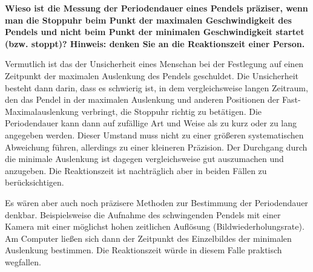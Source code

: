 \documentclass[
]{article}
\begin{document}
\textbf{Wieso ist die Messung der Periodendauer eines Pendels präziser,
wenn man die Stoppuhr beim Punkt der maximalen Geschwindigkeit des
Pendels und nicht beim Punkt der minimalen Geschwindigkeit startet (bzw.
stoppt)? Hinweis: denken Sie an die Reaktionszeit einer Person.}

Vermutlich ist das der Unsicherheit eines Menschan bei der Festlegung
auf einen Zeitpunkt der maximalen Auslenkung des Pendels geschuldet. Die
Unsicherheit besteht dann darin, dass es schwierig ist, in dem
vergleichsweise langen Zeitraum, den das Pendel in der maximalen
Auslenkung und anderen Positionen der Fast-Maximalauslenkung verbringt,
die Stoppuhr richtig zu betätigen. Die Periodendauer kann dann auf
zufällige Art und Weise als zu kurz oder zu lang angegeben werden.
Dieser Umstand muss nicht zu einer größeren systematischen Abweichung
führen, allerdings zu einer kleineren Präzision. Der Durchgang durch die
minimale Auslenkung ist dagegen vergleichsweise gut auszumachen und
anzugeben. Die Reaktionszeit ist nachträglich aber in beiden Fällen zu
berücksichtigen.

Es wären aber auch noch präzisere Methoden zur Bestimmung der
Periodendauer denkbar. Beispielsweise die Aufnahme des schwingenden
Pendels mit einer Kamera mit einer möglichst hohen zeitlichen Auflösung
(Bildwiederholungsrate). Am Computer ließen sich dann der Zeitpunkt des
Einzelbildes der minimalen Auslenkung bestimmen. Die Reaktionszeit würde
in diesem Falle praktisch wegfallen.
\end{document}
